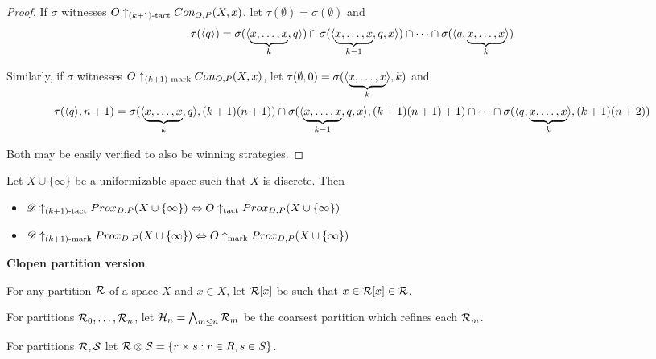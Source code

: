 \begin{proof}
  If $\sigma$ witnesses $O\uparrow_{(k+1)\text{-tact}}Con_{O,P}(X,x)$, let $\tau(\emptyset)=\sigma(\emptyset)$ and
    \[
      \tau(\langle q\rangle)
        =
      \sigma(\langle\underbrace{x,\dots,x}_k,q\rangle)
        \cap
      \sigma(\langle\underbrace{x,\dots,x}_{k-1},q,x\rangle)
        \cap\dots\cap
      \sigma(\langle q,\underbrace{x,\dots,x}_k\rangle)
    \]

  Similarly, if $\sigma$ witnesses $O\uparrow_{(k+1)\text{-mark}}Con_{O,P}(X,x)$, let $\tau(\emptyset,0)=\sigma(\langle\underbrace{x,\dots,x}_k\rangle,k)$ and
    \[
      \tau(\langle q\rangle,n+1)
        =
      \sigma(\langle\underbrace{x,\dots,x}_k,q\rangle,(k+1)(n+1))
        \cap
      \sigma(\langle\underbrace{x,\dots,x}_{k-1},q,x\rangle,(k+1)(n+1)+1)
        \cap\dots\cap
      \sigma(\langle q,\underbrace{x,\dots,x}_k\rangle,(k+1)(n+2))
    \]

  Both may be easily verified to also be winning strategies.
\end{proof}

\begin{corollary}
  Let $X\cup\{\infty\}$ be a uniformizable space such that $X$ is discrete. Then
  \begin{itemize}
    \item
      $\mathscr{D}\uparrow_{(k+1)\text{-tact}}Prox_{D,P}(X\cup\{\infty\}) \Leftrightarrow O\uparrow_{\text{tact}}Prox_{D,P}(X\cup\{\infty\})$
    \item
      $\mathscr{D}\uparrow_{(k+1)\text{-mark}}Prox_{D,P}(X\cup\{\infty\}) \Leftrightarrow O\uparrow_{\text{mark}}Prox_{D,P}(X\cup\{\infty\})$
  \end{itemize}
\end{corollary}
























\newpage

\centerline{\bf Clopen partition version}

\begin{definition}
  For any partition $\mathcal{R}$ of a space $X$ and $x\in X$, let $\mathcal{R}[x]$ be such that $x\in\mathcal{R}[x]\in\mathcal{R}$.

  For partitions $\mathcal{R}_0,\dots,\mathcal{R}_n$, let $\mathcal{H}_n=\bigwedge_{m\leq n} \mathcal{R}_m$ be the coarsest partition which refines each $\mathcal{R}_m$.

  For partitions $\mathcal{R},\mathcal{S}$ let $\mathcal{R}\otimes \mathcal{S} = \{r\times s: r\in R, s\in S\}$.
\end{definition}

